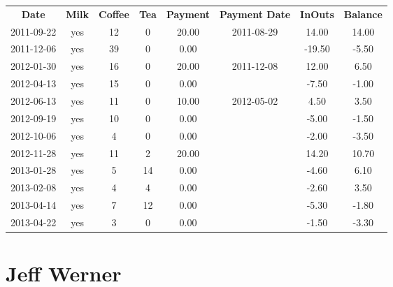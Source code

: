 \begin{center}
\begin{tabular}{cccccccc}
\textbf{Date} & \textbf{Milk} & \textbf{Coffee} & \textbf{Tea} & \textbf{Payment} & \textbf{Payment Date} & \textbf{InOuts} & \textbf{Balance} \\
2011-09-22 & yes & 12 &  0 & 20.00 & 2011-08-29 &  14.00 & 14.00\\ 
2011-12-06 & yes & 39 &  0 &  0.00 &  & -19.50 & -5.50\\ 
2012-01-30 & yes & 16 &  0 & 20.00 & 2011-12-08 &  12.00 &  6.50\\ 
2012-04-13 & yes & 15 &  0 &  0.00 &  &  -7.50 & -1.00\\ 
2012-06-13 & yes & 11 &  0 & 10.00 & 2012-05-02 &   4.50 &  3.50\\ 
2012-09-19 & yes & 10 &  0 &  0.00 &  &  -5.00 & -1.50\\ 
2012-10-06 & yes &  4 &  0 &  0.00 &  &  -2.00 & -3.50\\ 
2012-11-28 & yes & 11 &  2 & 20.00 &  &  14.20 & 10.70\\ 
2013-01-28 & yes &  5 & 14 &  0.00 &  &  -4.60 &  6.10\\ 
2013-02-08 & yes &  4 &  4 &  0.00 &  &  -2.60 &  3.50\\ 
2013-04-14 & yes &  7 & 12 &  0.00 &  &  -5.30 & -1.80\\ 
2013-04-22 & yes &  3 &  0 &  0.00 &  &  -1.50 & -3.30
\end{tabular}
\end{center}

\section{Jeff Werner}

